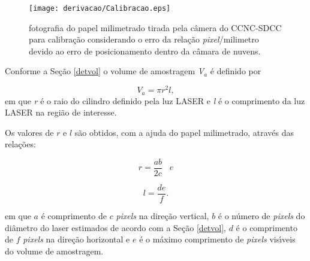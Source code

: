 \begin{figure}[hbt]
\begin{center}
\texttt{[image: derivacao/Calibracao.eps]}\\
\end{center}
\centering \caption{\label{PapelMili}\hspace{-0.1em} fotografia do papel milimetrado tirada pela c\^{a}mera do CCNC-SDCC para calibra\c{c}\~{a}o considerando o erro da rela\c{c}\~{a}o \emph{pixel}/milimetro devido ao erro de posicionamento dentro da c\^{a}mara de nuvens.}
\end{figure}

Conforme a Se\c{c}\~{a}o \ref{detvol} o volume de amostragem \textit{V$_{a}$} \'{e} definido por

\begin{equation}
\label {eqvol}
V_a  = \pi r^2 l,
\end{equation}
em que \textit{r} \'{e} o raio do cilindro definido pela luz LASER e \textit{l} \'{e} o comprimento da luz LASER na regi\~{a}o de interesse.

Os valores de $r$ e $l$ s\~{a}o obtidos, com a ajuda do papel milimetrado, atrav\'{e}s das rela\c{c}\~{o}es:

\begin{equation}
\label {eqr}
r = \frac{{ab}}{{2c}}\;\;\;e
\end{equation}


\begin{equation}
\label {eql}
l = \frac{{de}}{f}.
\end{equation}

em que $a$ \'{e} comprimento de $c$ \emph{pixels} na dire\c{c}\~{a}o vertical, $b$ \'{e} o n\'{u}mero de \emph{pixels} do di\^{a}metro do laser estimados de acordo com a Se\c{c}\~{a}o \ref{detvol}, $d$ \'{e} o comprimento de $f$ \emph{pixels} na dire\c{c}\~{a}o horizontal e $e$ \'{e} o m\'{a}ximo comprimento  de \emph{pixels} vis\'{\i}veis do volume de amostragem.


